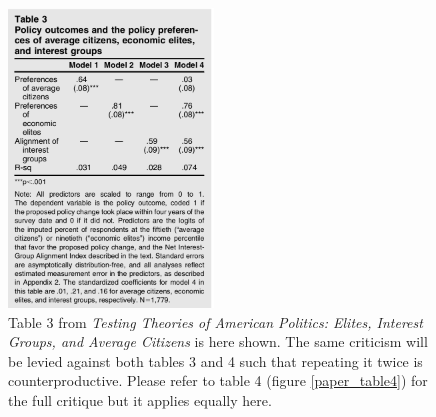 \documentclass[]{article}
\begin{document}
\begin{figure}[H]
	\begin{center}
		\includegraphics[height=300px]{./figures/paper/economic-table3.png}
	\end{center}	
	\caption{Table 3 from \textit{Testing Theories of American Politics: Elites, Interest Groups, and Average Citizens} is here shown. The same criticism will be levied against both tables 3 and 4 such that repeating it twice is counterproductive. Please refer to table 4 (figure \ref{paper_table4}) for the full critique but it applies equally here.}
	\label{paper_table3}
\end{figure}
\end{document}
